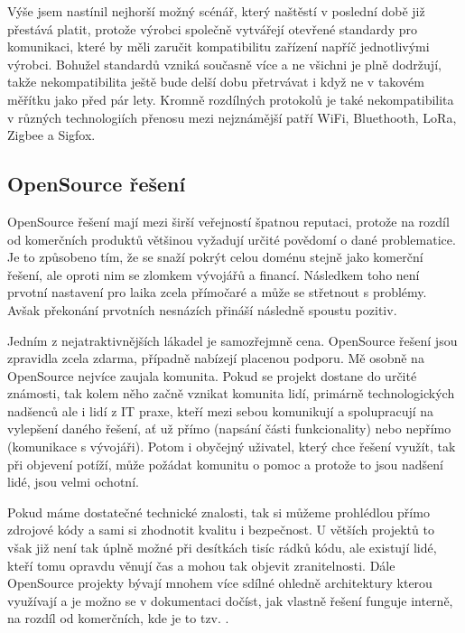 \documentclass[thesis=B,czech]{FITthesis}[2019/12/23]
\begin{document}
Výše jsem nastínil nejhorší možný scénář, který naštěstí v poslední době již přestává platit, protože výrobci společně vytvářejí otevřené standardy pro komunikaci, které by měli zaručit kompatibilitu zařízení napříč jednotlivými výrobci. Bohužel standardů vzniká současně více a ne všichni je plně dodržují, takže nekompatibilita ještě bude delší dobu přetrvávat i když ne v takovém měřítku jako před pár lety. Kromně rozdílných protokolů je také nekompatibilita v různých technologiích přenosu mezi nejznámější patří WiFi, Bluethooth, LoRa, Zigbee a Sigfox.

\subsection{OpenSource řešení}
OpenSource řešení mají mezi širší veřejností špatnou reputaci, protože na rozdíl od komerčních  produktů většinou vyžadují určité povědomí o dané problematice. Je to způsobeno tím, že se snaží pokrýt celou doménu stejně jako komerční řešení, ale oproti nim se zlomkem vývojářů a financí. Následkem toho není prvotní nastavení pro laika zcela přímočaré a může se střetnout s problémy. Avšak překonání prvotních nesnázích přináší následně spoustu pozitiv.

Jedním z nejatraktivnějších lákadel je samozřejmně cena. OpenSource řešení jsou zpravidla zcela zdarma, případně nabízejí placenou podporu. Mě osobně na OpenSource nejvíce zaujala komunita. Pokud se projekt dostane do určité známosti, tak kolem něho začně vznikat komunita lidí, primárně technologických nadšenců ale i lidí z IT praxe, kteří mezi sebou komunikují a spolupracují na vylepšení daného řešení, ať už přímo (napsání části funkcionality) nebo nepřímo (komunikace s vývojáři). Potom i obyčejný uživatel, který chce řešení využít, tak při objevení potíží, může požádat komunitu o pomoc a protože to jsou nadšení lidé, jsou velmi ochotní.

Pokud máme dostatečné technické znalosti, tak si můžeme prohlédlou přímo zdrojové kódy a sami si zhodnotit kvalitu i bezpečnost. U větších projektů to však již není tak úplně možné při desítkách tisíc rádků kódu, ale existují lidé, kteří tomu opravdu věnují čas a mohou tak objevit zranitelnosti. Dále OpenSource projekty bývají mnohem více sdílné ohledně architektury kterou využívají a je možno se v dokumentaci dočíst, jak vlastně řešení funguje interně, na rozdíl od komerčních, kde je to tzv. .
\end{document}
